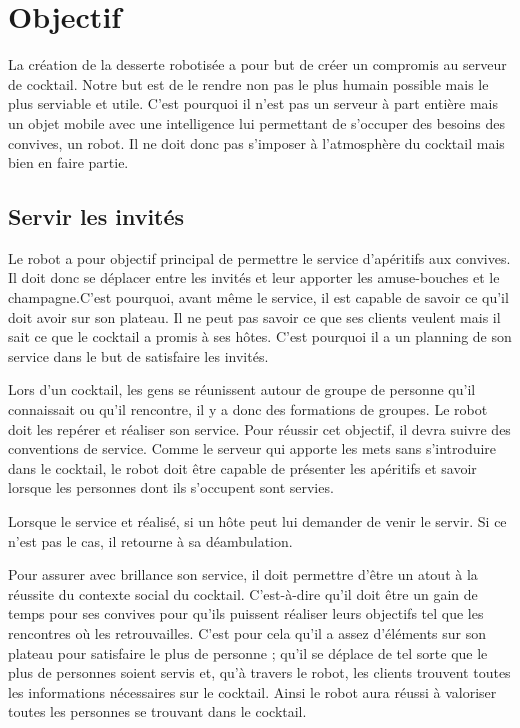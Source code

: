  
\chapter{Objectif}

La création de la desserte robotisée a pour but de créer un compromis au serveur de cocktail. Notre but est de le rendre non pas le plus humain possible mais le plus serviable et utile. C’est pourquoi il n’est pas un serveur à part entière mais un objet mobile avec une intelligence lui permettant de s’occuper des besoins des convives, un robot. Il ne doit donc pas s’imposer à l’atmosphère du cocktail mais bien en faire partie.

\section{Servir les invités}

Le robot a pour objectif principal de permettre le service d’apéritifs aux convives. Il doit donc se déplacer entre les invités et leur apporter les amuse-bouches et le champagne.C’est pourquoi, avant même le service, il est capable de savoir ce qu’il doit avoir sur son plateau. Il ne peut pas savoir ce que ses clients veulent mais il sait ce que le cocktail a promis à ses hôtes. C’est pourquoi il a un planning de son service dans le but de satisfaire les invités.

Lors d’un cocktail, les gens se réunissent autour de groupe de personne qu’il connaissait ou qu’il rencontre, il y a donc des formations de groupes. Le robot doit les repérer et réaliser son service. Pour réussir cet objectif, il devra suivre des conventions de service. Comme le serveur qui apporte les mets sans s’introduire dans le cocktail, le robot doit être capable de présenter les apéritifs et savoir lorsque les personnes dont ils s’occupent sont servies. 

Lorsque le service et réalisé, si un hôte peut lui demander de venir le servir. Si ce n’est pas le cas, il retourne à sa déambulation.

Pour assurer avec brillance son service, il doit permettre d’être un atout à la réussite du contexte social du cocktail. C’est-à-dire qu’il doit être un gain de temps pour ses convives pour qu’ils puissent réaliser leurs objectifs tel que les rencontres où les retrouvailles. C’est pour cela qu’il a assez d’éléments sur son plateau pour satisfaire le plus de personne ; qu’il se déplace de tel sorte que le plus de personnes soient servis et, qu’à travers le robot, les clients trouvent toutes les informations nécessaires sur le cocktail. Ainsi le robot aura réussi à valoriser toutes les personnes se trouvant dans le cocktail.

